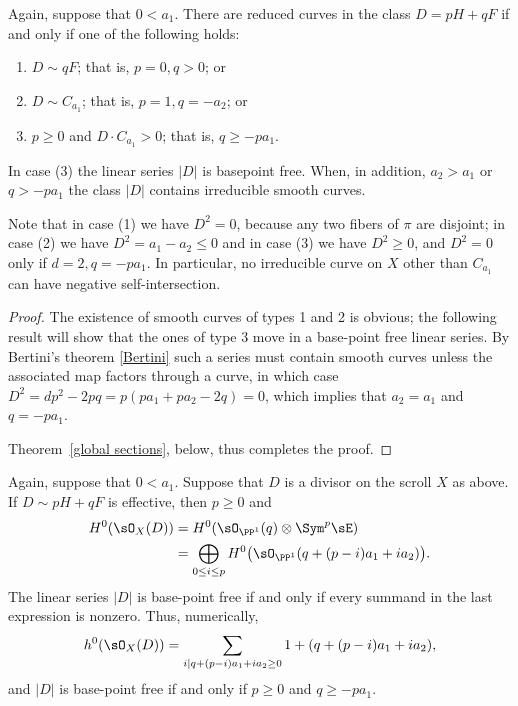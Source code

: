 \begin{theorem}\label{where are the curves?} Again, suppose that $0<a_{1}$.
There are reduced  curves in the class $D = pH+qF$ if and only if one of the following holds:

\begin{enumerate}
\item $D\sim qF$; that is, $p=0, q>0$; or
\item $D\sim C_{a_{1}}$; that is, $p=1, q=-a_{2}$; or
\item $p\geq 0$ and $D\cdot C_{a_{1}}> 0$; that is, $q \geq -pa_1.$
\end{enumerate}
In case (3) the linear series $|D|$ is basepoint free. When, in addition, $a_2>a_1$ or $q>-pa_1$ the class $|D|$ contains irreducible smooth curves.
\end{theorem}

Note that in case (1) we have $D^{2} = 0$, because any two fibers of $\pi$ are disjoint; in case (2) we have $D^{2}= a_{1}-a_{2}\leq 0$ and in case (3) we have $D^{2}\geq 0$, and $D^2=0$ only if
$d=2, q = -pa_1$. In particular, no irreducible curve
on $X$ other than $C_{a_1}$ can have negative self-intersection.

\begin{proof}
The existence of smooth curves of types 1 and 2 is obvious; the following result will show that
the ones of type 3 move in a base-point free linear series. By Bertini's theorem \ref{Bertini} such a series must contain smooth curves unless the associated map factors through a curve, in which case $D^2 = dp^2-2pq = p(pa_1+pa_2 -2 q) = 0$, which implies that $a_2=a_1$ and $q= -pa_1$.

Theorem~\ref{global sections}, below, thus completes the proof.
\end{proof}

\begin{theorem}\label{global sections} Again, suppose that $0<a_{1}$.
Suppose that $D$ is a divisor on the scroll $X$ as above. If $D \sim pH+qF$ is effective,  then $p\geq 0$ and
\begin{align*}
 H^{0}(\sO_{X}(D)) &= H^{0}(\sO_{\PP^{1}}(q) \otimes \Sym^{p} \sE)\\
 &= 
\bigoplus_{0\leq i\leq p}H^{0}\bigl(\sO_{\PP^{1}}(q + (p-i)a_{1}+i a_{2})\bigr).
\end{align*}
The linear series $|D|$ is base-point free if and only if every summand in the last expression is nonzero.
Thus, numerically,
$$
h^{0}(\sO_{X}(D)) = 
\sum_{i \mid q+(p-i)a_{1}+i a_{2} \geq 0}1+(q + (p-i)a_{1}+i a_{2}),
$$
and
$|D|$ is base-point free if and only if $p\geq 0$ and $q\geq -pa_{1}$.
\end{theorem}

